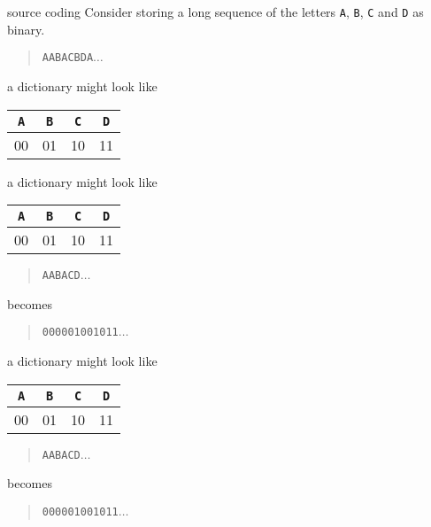 \documentclass{beamer}
\newcommand{\cbla}{\color{black}}
\newcommand{\cred}{\color{red}}
\newcommand{\cblu}{\color{blue}}
\newcommand{\cgre}{\color{green}}
\newcommand{\letter}[1]{\color{blue}\texttt{#1}\color{black}}
\newcommand{\binary}[1]{\color{red}\texttt{#1}\color{black}}
\begin{document}
\begin{frame}{source coding}
  Consider storing a long sequence of the letters \letter{A}, \letter{B}, \letter{C}{} and \letter{D}{} as binary.
  \begin{quote}
    \letter{AABACBDA}$\ldots$
    \end{quote}
\end{frame}

\begin{frame}{a dictionary might look like}
\begin{center}
\begin{tabular}{cccc}
\letter{A}&\letter{B}&\letter{C}&\letter{D}\\
\hline\cred
00&\cred 01&\cred 10&\cred 11
\cbla\end{tabular}
\end{center}
\end{frame}


\begin{frame}{a dictionary might look like}
\begin{center}
\begin{tabular}{cccc}
\letter{A}&\letter{B}&\letter{C}&\letter{D}\\
\hline\cred
00&\cred 01&\cred 10&\cred 11
\cbla\end{tabular}
\end{center}
  \begin{quote}
    \letter{AABACD}$\ldots$
  \end{quote}
  becomes
    \begin{quote}
    \binary{000001001011}$\ldots$
    \end{quote}
\end{frame}


\begin{frame}{a dictionary might look like}
\begin{center}
\begin{tabular}{cccc}
\letter{A}&\letter{B}&\letter{C}&\letter{D}\\
\hline\cred
00&\cred 01&\cred 10&\cred 11
\cbla\end{tabular}
\end{center}
  \begin{quote}
    \letter{\cgre A\cblu{}ABACD}$\ldots$
  \end{quote}
  becomes
    \begin{quote}
    \binary{\cgre 00\cred{}0001001011}$\ldots$
    \end{quote}
\end{frame}
\end{document}
